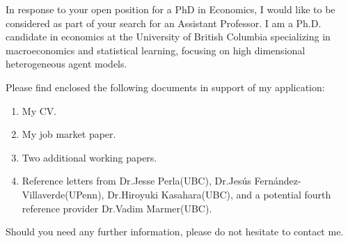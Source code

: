 \documentclass[11pt, a4paper]{awesome-cv}
\begin{document}
\makecvheader
\makelettertitle
\begin{cvletter}

 In response to your open position for a PhD in Economics, I would like to be considered as part of your search for an Assistant Professor. I am a Ph.D. candidate in economics at the University of British Columbia specializing in macroeconomics and statistical learning, focusing on high dimensional heterogeneous agent models.
 
 Please find enclosed the following documents in support of my application:
 \begin{enumerate}
 	\item My CV.
 	\item My job market paper.
 	\item Two additional working papers.
 	\item Reference letters from Dr.Jesse Perla(UBC), Dr.Jesús Fernández-Villaverde(UPenn), Dr.Hiroyuki Kasahara(UBC), and a potential fourth reference provider Dr.Vadim Marmer(UBC).
 \end{enumerate}
 Should you need any further information, please do not hesitate to contact me.
 









\end{cvletter}

\makeletterclosing
\end{document}
